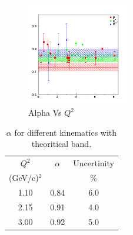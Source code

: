 \documentclass[aps,11pt]{revtex4}
\begin{document}
\begin{figure}[!ht]
	\centering
		\includegraphics[width=0.40\textwidth]{alpha.png}
	\caption{Alpha Vs $Q^2$}
	\label{fig:alpha}
\end{figure}

\begin{table}[!ht] 
\begin{tabular}{||c|c|c||}\hline
 $Q^2$ & $\alpha$ & Uncertinity \\
 (GeV/c)$^2$ &  & $\%$ \\\hline
1.10 & 0.84 &6.0 \\
2.15 & 0.91 &4.0 \\
3.00 & 0.92 &5.0 \\\hline
\end{tabular}
\caption{\label{table1} $\alpha$ for different kinematics with theoritical band.}\label{tab:alpha}

\vspace{-0.5cm}
\end{table}
\end{document}
